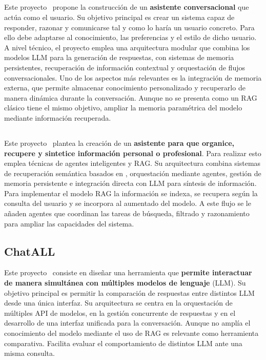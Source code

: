 \subsection{}
Este proyecto~\cite{trabajorelacionado:LLM_twin} propone la construcción de un \textbf{asistente conversacional} que actúa como el usuario. Su objetivo principal es crear un sistema capaz de responder, razonar y comunicarse tal y como lo haría un usuario concreto. Para ello debe adaptarse al conocimiento, las preferencias y el estilo de dicho usuario. A nivel técnico, el proyecto emplea una arquitectura modular que combina los modelos LLM para la generación de respuestas, con sistemas de memoria persistentes, recuperación de información contextual y orquestación de flujos conversacionales. Uno de los aspectos más relevantes es la integración de memoria externa, que permite almacenar conocimiento personalizado y recuperarlo de manera dinámica durante la conversación. Aunque no se presenta como un RAG clásico tiene el mismo objetivo, ampliar la memoria paramétrica del modelo mediante información recuperada.

\subsection{}
Este proyecto~\cite{trabajorelacionado:second_brain} plantea la creación de un \textbf{asistente para que organice, recupere y sintetice información personal o profesional}. Para realizar esto emplea técnicas de agentes inteligentes y RAG. Su arquitectura combina sistemas de recuperación semántica basados en , orquestación mediante agentes, gestión de memoria persistente e integración directa con LLM para síntesis de información. Para implementar el modelo RAG la información se indexa, se recupera según la consulta del usuario y se incorpora al  aumentado del modelo. A este flujo se le añaden agentes que coordinan las tareas de búsqueda, filtrado y razonamiento para ampliar las capacidades del sistema.

\subsection{ChatALL}
Este proyecto~\cite{trabajorelacionado:ChatAll} consiste en diseñar una herramienta que \textbf{permite interactuar de manera simultánea con múltiples modelos de lenguaje} (LLM). Su objetivo principal es permitir la comparación de respuestas entre distintos LLM desde una única interfaz. Su arquitectura se centra en la orquestación de múltiples API de modelos, en la gestión concurrente de respuestas y en el desarrollo de una interfaz unificada para la conversación. Aunque no amplía el conocimiento del modelo mediante el uso de RAG es relevante como herramienta comparativa. Facilita evaluar el comportamiento de distintos LLM ante una misma consulta.

